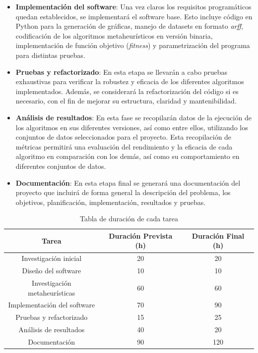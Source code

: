 \begin{itemize}
      \item \textbf{Implementación del software}: Una vez claros los requisitos programáticos quedan establecidos, se implementará el software base. Esto incluye código en Python para la generación de gráficas, manejo de datasets en formato \textit{arff}, codificación de los algoritmos metaheurísticos en versión binaria, implementación de función objetivo (\textit{fitness}) y parametrización del programa para distintas pruebas.
      \item \textbf{Pruebas y refactorizado}: En esta etapa se llevarán a cabo pruebas exhaustivas para verificar la robustez y eficacia de los diferentes algoritmos implementados. Además, se considerará la refactorización del código si es necesario, con el fin de mejorar su estructura, claridad y mantenibilidad.
      \item \textbf{Análisis de resultados}: En esta fase se recopilarán datos de la ejecución de los algoritmos en sus diferentes versiones, así como entre ellos, utilizando los conjuntos de datos seleccionados para el proyecto. Esta recopilación de métricas permitirá una evaluación del rendimiento y la eficacia de cada algoritmo en comparación con los demás, así como su comportamiento en diferentes conjuntos de datos.
      \item \textbf{Documentación}: En esta etapa final se generará una documentación del proyecto que incluirá de forma general la descripción del problema, los objetivos, planificación, implementación, resultados y pruebas.
\end{itemize}

\begin{table}[htp]
      \centering
      \begin{tabular}{c|c|c}
            Tarea                         & Duración Prevista (h) & Duración Final (h) \\ \hline
            Investigación inicial         & 20                    & 20                 \\
            Diseño del software           & 10                    & 10                 \\
            Investigación metaheurísticas & 60                    & 60                 \\
            Implementación del software   & 70                    & 90                 \\
            Pruebas y refactorizado       & 15                    & 25                 \\
            Análisis de resultados        & 40                    & 20                 \\
            Documentación                 & 90                    & 120                \\ \hline
      \end{tabular}
      \caption{Tabla de duración de cada tarea}
      \label{tab:task_duration}
\end{table}

